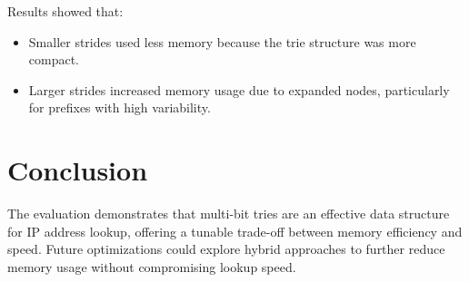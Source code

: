 \documentclass[12pt	]{article}
\begin{document}
Results showed that:
\begin{itemize}
	\item Smaller strides used less memory because the trie structure was more compact.
	\item Larger strides increased memory usage due to expanded nodes, particularly for prefixes with high variability.
\end{itemize}


\section{Conclusion}
The evaluation demonstrates that multi-bit tries are an effective data structure for IP address lookup, offering a tunable trade-off between memory efficiency and speed. Future optimizations could explore hybrid approaches to further reduce memory usage without compromising lookup speed.



\newpage


\end{document}
